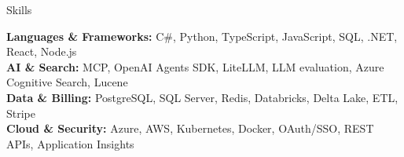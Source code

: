 \documentclass{resume} %
\begin{document}
\begin{rSection}{Skills}
{\raggedright
\textbf{Languages \& Frameworks:} C\#, Python, TypeScript, JavaScript, SQL, .NET, React, Node.js \\
\textbf{AI \& Search:} MCP, OpenAI Agents SDK, LiteLLM, LLM evaluation, Azure Cognitive Search, Lucene \\
\textbf{Data \& Billing:} PostgreSQL, SQL Server, Redis, Databricks, Delta Lake, ETL, Stripe \\
\textbf{Cloud \& Security:} Azure, AWS, Kubernetes, Docker, OAuth/SSO, REST APIs, Application Insights
\par}
\end{rSection}
\end{document}
